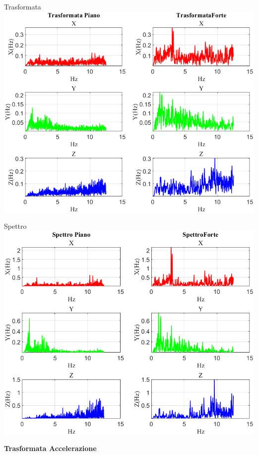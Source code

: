 	\begin{frame}{{Trasformata}}
		\centering\includegraphics[height=.8\textheight]{figure/Acc/Trasformata/Trasformata}
	\end{frame}
	
	\begin{frame}{{Spettro}}
		\centering\includegraphics[height=.8\textheight]{figure/Acc/Trasformata/Spettro}
	\end{frame}
	
	\begin{frame}
		\color{blue}\centering\huge{\textbf{Trasformata Accelerazione}}
	\end{frame}
	
